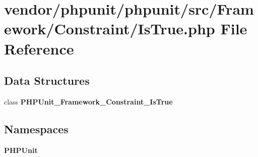 \section{vendor/phpunit/phpunit/src/\+Framework/\+Constraint/\+Is\+True.php File Reference}
\label{_is_true_8php}
\subsection*{Data Structures}
\begin{DoxyCompactItemize}
\item 
class {\bf P\+H\+P\+Unit\+\_\+\+Framework\+\_\+\+Constraint\+\_\+\+Is\+True}
\end{DoxyCompactItemize}
\subsection*{Namespaces}
\begin{DoxyCompactItemize}
\item 
 {\bf P\+H\+P\+Unit}
\end{DoxyCompactItemize}
